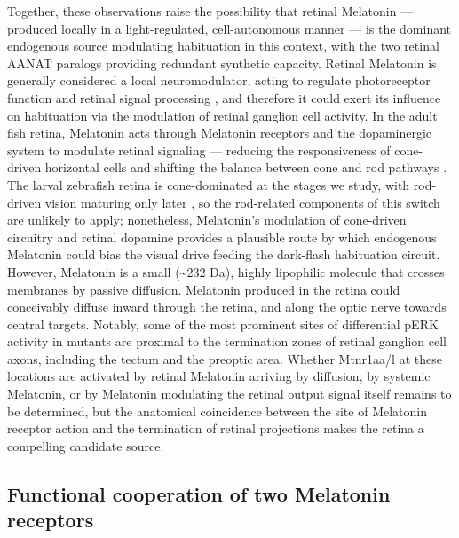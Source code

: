 \documentclass[9.5pt]{RandlettLab_elife}            %
\begin{document}
Together, these observations raise the possibility that retinal Melatonin — produced locally in a light-regulated, cell-autonomous manner — is the dominant endogenous source modulating habituation in this context, with the two retinal AANAT paralogs providing redundant synthetic capacity.
Retinal Melatonin is generally considered a local neuromodulator, acting to regulate photoreceptor function and retinal signal processing \citep{Besharse2016, Bhoi2023}, and therefore it could exert its influence on habituation via the modulation of retinal ganglion cell activity.
In the adult fish retina, Melatonin acts through Melatonin receptors and the dopaminergic system to modulate retinal signaling — reducing the responsiveness of cone-driven horizontal cells and shifting the balance between cone and rod pathways \citep{Ribelayga2004, Huang2012}.
The larval zebrafish retina is cone-dominated at the stages we study, with rod-driven vision maturing only later \citep{Saszik1999}, so the rod-related components of this switch are unlikely to apply; nonetheless, Melatonin's modulation of cone-driven circuitry and retinal dopamine provides a plausible route by which endogenous Melatonin could bias the visual drive feeding the dark-flash habituation circuit.
However, Melatonin is a small (\textasciitilde232 Da), highly lipophilic molecule that crosses membranes by passive diffusion.
Melatonin produced in the retina could conceivably diffuse inward through the retina, and along the optic nerve towards central targets.
Notably, some of the most prominent sites of differential pERK activity in mutants are proximal to the termination zones of retinal ganglion cell axons, including the tectum and the preoptic area.
Whether Mtnr1aa/l at these locations are activated by retinal Melatonin arriving by diffusion, by systemic Melatonin, or by Melatonin modulating the retinal output signal itself remains to be determined, but the anatomical coincidence between the site of Melatonin receptor action and the termination of retinal projections makes the retina a compelling candidate source.

\subsection*{Functional cooperation of two Melatonin receptors}
\end{document}
